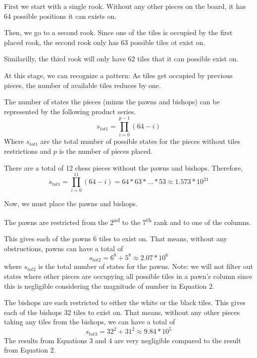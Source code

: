 \documentclass[11pt]{article}
\begin{document}
\begin{flushleft}
First we start with a single rook. Without any other pieces on the board, it has
64 possible positions it can exists on.

Then, we go to a second rook. Since one of the tiles is occupied by the first
placed rook, the second rook only has 63 possible tiles ot exist on.

Similarilly, the third rook will only have 62 tiles that it can possible exist
on.

At this stage, we can recognize a pattern: As tiles get occupied by previous
    pieces, the number of available tiles reduces by one.

The number of states the pieces (minus the pawns and bishops) can be represented
by the following product series.
\begin{equation}
    s_{tot1} = \prod_{i = 0}^{p - 1} (64 - i)
\end{equation}
Where $s_{tot1}$ are the total number of possible states for the pieces without
tiles restrictions and $p$ is the number of pieces placed.

There are a total of 12 chess pieces without the pawns and bishops.
Therefore,
\begin{equation}
    s_{tot1} = \prod_{i = 0}^{11} (64 - i) = 64 * 63 * ... * 53 \approx 1.573 *
    10^{21}
\end{equation}

Now, we must place the pawns and bishops.

The pawns are restricted from the 2\textsuperscript{nd} to the
7\textsuperscript{th} rank and to one of the columns.

This gives each of the pawns 6 tiles to exist on. That means, without any
obstructions, pawns can have a total of
\begin{equation}
    s_{tot2} = 6^{8} + 5^{8} \approx 2.07 * 10^{6}
\end{equation}
where $s_{tot2}$ is the total number of states for the pawns. Note: we will not
filter out states where other pieces are occupying all possible tiles in a
pawn's column since this is negligible considering the magnitude of number in
Equation $2$.

The bishops are each restricted to either the white or the black tiles. This
gives each of the bishops 32 tiles to exist on. That means, without any
other pieces taking any tiles from the bishops, we can have a total of
\begin{equation}
    s_{tot3} = 32^{2} + 31^{2} \approx 9.84 * 10^{5}
\end{equation}
The results from Equations $3$ and $4$ are very negligible compared to the
result from Equation $2$.


\end{flushleft}
\end{document}
